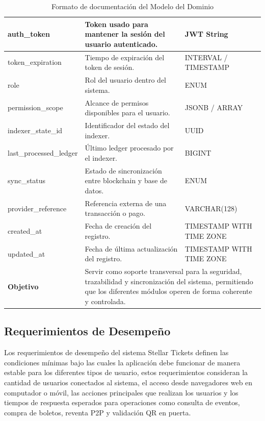 \documentclass[12pt,letterpaper]{article}
\begin{document}
\begin{table}[H]
\begin{tabularx}{\textwidth}{|p{3.2cm}|X|p{3.8cm}|}
auth\_token & Token usado para mantener la sesión del usuario autenticado. & JWT String \\ \hline
token\_expiration & Tiempo de expiración del token de sesión. & INTERVAL / TIMESTAMP \\ \hline
role & Rol del usuario dentro del sistema. & ENUM \\ \hline
permission\_scope & Alcance de permisos disponibles para el usuario. & JSONB / ARRAY \\ \hline
indexer\_state\_id & Identificador del estado del indexer. & UUID \\ \hline
last\_processed\_ledger & Último ledger procesado por el indexer. & BIGINT \\ \hline
sync\_status & Estado de sincronización entre blockchain y base de datos. & ENUM \\ \hline
provider\_reference & Referencia externa de una transacción o pago. & VARCHAR(128) \\ \hline
created\_at & Fecha de creación del registro. & TIMESTAMP WITH TIME ZONE \\ \hline
updated\_at & Fecha de última actualización del registro. & TIMESTAMP WITH TIME ZONE \\ \hline

\textbf{Objetivo} & 
\multicolumn{2}{X|}{Servir como soporte transversal para la seguridad, trazabilidad y sincronización del sistema, permitiendo que los diferentes módulos operen de forma coherente y controlada.} \\ \hline

\end{tabularx}

\caption{Formato de documentación del Modelo del Dominio}
\label{tab:modelo_dominio_autenticacion_roles_indexer}
\normalsize
\end{table}

\subsection{Requerimientos de Desempeño}
Los requerimientos de desempeño del sistema Stellar Tickets definen las condiciones mínimas bajo las cuales la aplicación debe funcionar de manera estable para los diferentes tipos de usuario, estos requerimientos consideran la cantidad de usuarios conectados al sistema, el acceso desde navegadores web en computador o móvil, las acciones principales que realizan los usuarios y los tiempos de respuesta esperados para operaciones como consulta de eventos, compra de boletos, reventa P2P y validación QR en puerta.
\end{document}
